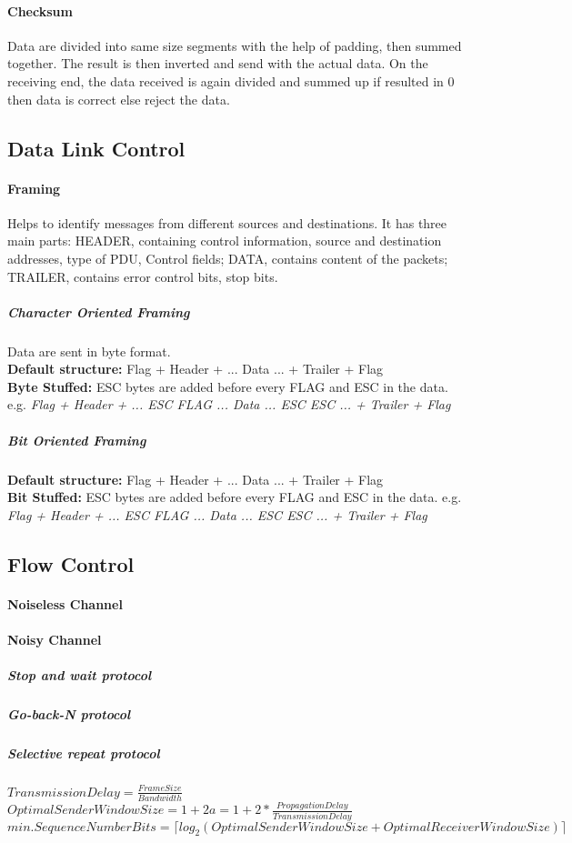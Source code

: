 \paragraph{Checksum} Data are divided into same size segments with the help of padding, then summed together. The result is then inverted and send with the actual data. On the receiving end, the data received is again divided and summed up if resulted in 0 then data is correct else reject the data.
\subsection{Data Link Control}
\paragraph{Framing}  Helps to identify messages from different sources and destinations. It has three main parts: HEADER, containing control information, source and destination addresses, type of PDU, Control fields; DATA, contains content of the packets; TRAILER, contains error control bits, stop bits.
\subparagraph{Character Oriented Framing} Data are sent in byte format.\\
\indent \indent \textbf{Default structure:} Flag + Header + ... Data ... + Trailer + Flag\\
\indent \indent \textbf{Byte Stuffed:} ESC bytes are added before every FLAG and ESC in the data. e.g. \textit{Flag + Header + ... ESC FLAG ... Data ... ESC ESC ... + Trailer + Flag}
\subparagraph{Bit Oriented Framing}
\indent \indent \textbf{Default structure:} Flag + Header + ... Data ... + Trailer + Flag\\
\indent \indent \textbf{Bit Stuffed:} ESC bytes are added before every FLAG and ESC in the data. e.g. \textit{Flag + Header + ... ESC FLAG ... Data ... ESC ESC ... + Trailer + Flag}
\subsection{Flow Control}
\paragraph{Noiseless Channel}
\paragraph{Noisy Channel}
\subparagraph{Stop and wait protocol}
\subparagraph{Go-back-N protocol}
\subparagraph{Selective repeat protocol}
$TransmissionDelay=\frac{FrameSize}{Bandwidth}$ $OptimalSenderWindowSize=1+2a=1+2*\frac{PropagationDelay}{TransmissionDelay}$ $min.SequenceNumberBits=\lceil log_2(OptimalSenderWindowSize+OptimalReceiverWindowSize)\rceil$
